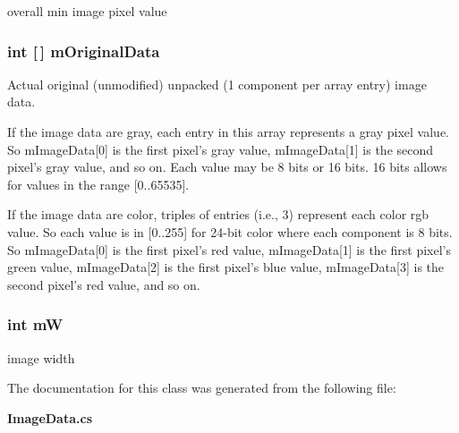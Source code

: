 overall min image pixel value 

\subsubsection{\setlength{\rightskip}{0pt plus 5cm}int [$\,$] {\bf m\-Original\-Data}\hspace{0.3cm}{\tt  [protected]}}\label{class_c_s_image_viewer_1_1_image_data_11d80308f1ea8f14ee0ea822696f4f97}


Actual original (unmodified) unpacked (1 component per array entry) image data. 

If the image data are gray, each entry in this array represents a gray pixel value. So m\-Image\-Data[0] is the first pixel's gray value, m\-Image\-Data[1] is the second pixel's gray value, and so on. Each value may be 8 bits or 16 bits. 16 bits allows for values in the range [0..65535]. \par
 \par
 If the image data are color, triples of entries (i.e., 3) represent each color rgb value. So each value is in [0..255] for 24-bit color where each component is 8 bits. So m\-Image\-Data[0] is the first pixel's red value, m\-Image\-Data[1] is the first pixel's green value, m\-Image\-Data[2] is the first pixel's blue value, m\-Image\-Data[3] is the second pixel's red value, and so on. 
\subsubsection{\setlength{\rightskip}{0pt plus 5cm}int {\bf m\-W}\hspace{0.3cm}{\tt  [protected]}}\label{class_c_s_image_viewer_1_1_image_data_b636a8ca59ea2d07827db0b24b129ccb}


image width 



The documentation for this class was generated from the following file:\begin{CompactItemize}
\item 
{\bf Image\-Data.cs}\end{CompactItemize}
